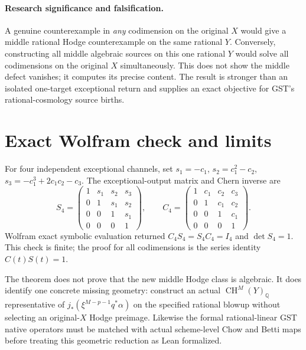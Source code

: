 \documentclass[11pt]{article}
\newcommand{\Q}{\mathbb Q}
\newcommand{\CH}{\operatorname{CH}}
\begin{document}
\paragraph{Research significance and falsification.}
A genuine counterexample in \emph{any} codimension on the
original $X$ would give a middle rational Hodge counterexample
on the same rational $Y$. Conversely, constructing all middle
algebraic sources on this one rational $Y$ would solve all
codimensions on the original $X$ simultaneously.
This does not show the middle defect vanishes; it computes
its precise content. The result is stronger than an isolated
one-target exceptional return and supplies an exact objective
for GST's rational-cosmology source births.

\section{Exact Wolfram check and limits}
For four independent exceptional channels, set
$s_1=-c_1$, $s_2=c_1^2-c_2$,
$s_3=-c_1^3+2c_1c_2-c_3$.
The exceptional-output matrix and Chern inverse are
\[
 S_4=\begin{pmatrix}
 1&s_1&s_2&s_3\\0&1&s_1&s_2\\0&0&1&s_1\\0&0&0&1
 \end{pmatrix},\qquad
 C_4=\begin{pmatrix}
 1&c_1&c_2&c_3\\0&1&c_1&c_2\\0&0&1&c_1\\0&0&0&1
 \end{pmatrix}.
\]
Wolfram exact symbolic evaluation returned
$C_4S_4=S_4C_4=I_4$ and $\det S_4=1$.
This check is finite; the proof for all codimensions
is the series identity $C(t)S(t)=1$.

The theorem does not prove that the new middle Hodge class is
algebraic. It does identify one concrete missing geometry:
construct an actual $\CH^M(Y)_{\Q}$ representative of
$j_*(\xi^{M-p-1}q^*\alpha)$ on the specified rational blowup
without selecting an original-$X$ Hodge preimage.
Likewise the formal rational-linear GST native operators
must be matched with actual scheme-level Chow and Betti maps
before treating this geometric reduction as Lean formalized.
\end{document}
